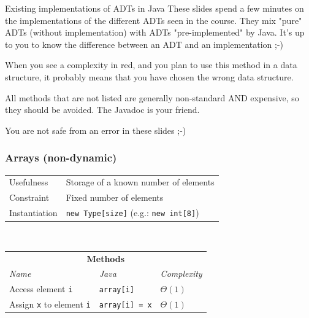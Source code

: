 \documentclass[8pt,aspectratio=169]{beamer}
\begin{document}

\begin{frame}{Existing implementations of ADTs in Java}
These slides spend a few minutes on the implementations of the different ADTs seen in the course. They mix "pure" ADTs (without implementation) with ADTs "pre-implemented" by Java.
It's up to you to know the difference between an ADT and an implementation ;-)

When you see a complexity in red, and you plan to use this method in a data structure, it probably means that you have chosen the wrong data structure.

All methods that are not listed are generally non-standard AND expensive, so they should be avoided. The Javadoc is your friend.

You are not safe from an error in these slides ;-)
\end{frame}

\begin{frame}
\frametitle{Arrays (non-dynamic)}
\centering
\begin{tabular}{lll}
	Usefulness & \multicolumn{2}{l}{Storage of a known number of elements}\\
	Constraint & \multicolumn{2}{l}{Fixed number of elements}\\
	Instantiation & \multicolumn{2}{l}{\texttt{new Type[size]} (e.g.: \texttt{new int[8]})}\\
\end{tabular}\\
\vspace{0.5cm}
\centering
\begin{tabular}{lll}
	\multicolumn{3}{c}{\textbf{Methods}} \\
	\textit{Name} & \textit{Java} & \textit{Complexity} \\
	Access element \texttt{i} & \texttt{array[i]} & $\Theta(1)$\\
	Assign \texttt{x} to element \texttt{i} & \texttt{array[i] = x} & $\Theta(1)$\\
\end{tabular}
\end{frame}
\end{document}
